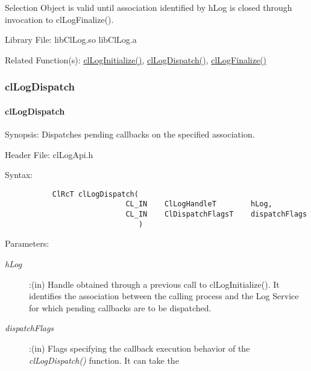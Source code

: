 \begin{flushleft}
\begin{Desc}
Selection Object is valid until association identified by hLog is closed through invocation to clLogFinalize().
\end{Desc}
\begin{Desc}
\item[Library File:] libClLog.so 
\newline
libClLog.a
\end{Desc}
\begin{Desc}
\item[Related Function(s):]\hyperlink{pagelog101}{clLogInitialize()}, \hyperlink{pagelog104}{clLogDispatch()}, 
\hyperlink{pagelog102}{clLogFinalize()}\end{Desc}
\newpage


\subsubsection{clLogDispatch}
\hypertarget{pagelog104}{}\paragraph{cl\-Log\-Dispatch}\label{pagelog104}
\begin{Desc}
\item[Synopsis:] Dispatches pending callbacks on the specified association.\end{Desc}
\begin{Desc}
\item[Header File:] clLogApi.h \end{Desc}
\begin{Desc}
\item[Syntax:]
\footnotesize\begin{verbatim}        	ClRcT clLogDispatch(
           					CL_IN    ClLogHandleT        hLog,
           					CL_IN    ClDispatchFlagsT    dispatchFlags
							   )
\end{verbatim}
\normalsize
\end{Desc}
\begin{Desc}
\item[Parameters:] \begin{description}
\item[{\em hLog}]:(in) Handle obtained through a previous call to clLogInitialize(). It identifies the association between the calling process and 
the Log Service for which pending callbacks are to be dispatched.
\item[{\em dispatchFlags}]:(in) Flags specifying the callback execution behavior of the \textit{clLogDispatch()} function. It can take the

\end{description}
\end{Desc}
\end{flushleft}
